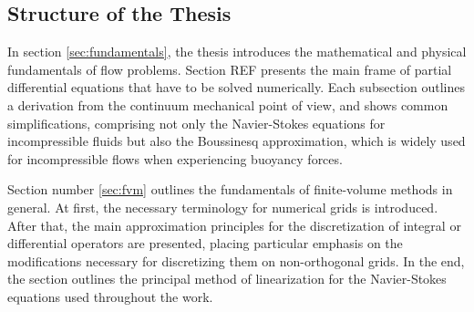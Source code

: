 \subsection{Structure of the Thesis}

In section \ref{sec:fundamentals}, the thesis introduces the mathematical and physical fundamentals of flow problems. Section REF presents the main frame of partial differential equations that have to be solved numerically. Each subsection outlines a derivation from the continuum mechanical point of view, and shows common simplifications, comprising not only the Navier-Stokes equations for incompressible fluids but also the Boussinesq approximation, which is widely used for incompressible flows when experiencing buoyancy forces.

Section number \ref{sec:fvm} outlines the fundamentals of finite-volume methods in general. At first, the necessary terminology for numerical grids is introduced. After that, the main approximation principles for the discretization of integral or differential operators are presented, placing particular emphasis on the modifications necessary for discretizing them on non-orthogonal grids. In the end, the section outlines the principal method of linearization for the Navier-Stokes equations used throughout the work.

